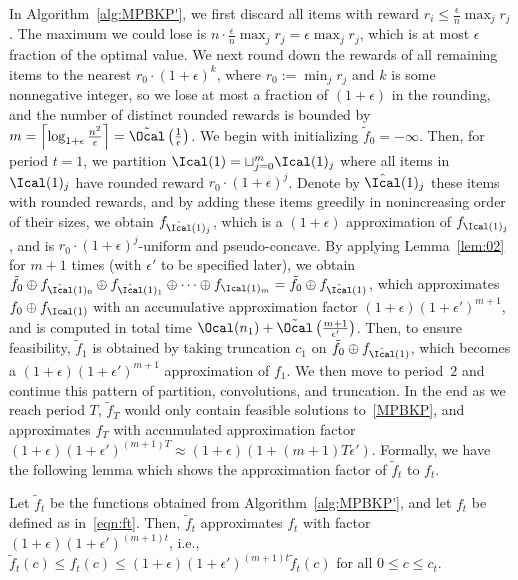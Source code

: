 In Algorithm~\ref{alg:MPBKP'}, we first discard all items with reward $r_i\le \frac{\epsilon}{n}\max_jr_j$. The maximum we could lose is $n\cdot \frac{\epsilon}{n}\max_jr_j = \epsilon\max_jr_j$, which is at most $\epsilon$ fraction of the optimal value. We next round down the rewards of all remaining items  to the nearest $r_0\cdot (1+\epsilon)^k$, where $r_0:=\min_jr_j$ and $k$ is some nonnegative integer, so we lose at most a fraction of $(1+\epsilon)$ in the rounding, and the number of distinct rounded rewards is bounded by $m = \left\lceil\log_{1+\epsilon}\frac{n^2}{\epsilon}\right\rceil = \tilde{\Ocal}\left(\frac{1}{\epsilon}\right)$. We begin with initializing $\tilde{f}_0=-\infty$. Then, for period $t=1$, we partition $\Ical(1)=\sqcup_{j=0}^m \Ical(1)_j$ where all items in $\Ical(1)_j$ have rounded reward $r_0\cdot (1+\epsilon)^j$. Denote by $\hat{\Ical}(1)_j$ these items with rounded rewards, and by adding these items greedily in nonincreasing order of their sizes, we obtain $f_{\hat{\Ical}(1)_j}$, which is a $(1+\epsilon)$ approximation of $f_{\Ical(1)_j}$, and is $r_0\cdot (1+\epsilon)^j$-uniform and pseudo-concave. 
By applying Lemma~\ref{lem:02} for $m+1$ times (with $\epsilon'$ to be specified later), we obtain $\tilde{f}_0\oplus f_{\hat{\Ical}(1)_0}\oplus f_{\hat{\Ical}(1)_1}\oplus\cdots \oplus f_{\Ical(1)_m} = \tilde{f}_0\oplus f_{\hat{\Ical}(1)}$, which approximates $f_0\oplus f_{\Ical(1)}$ with an accumulative approximation factor $(1+\epsilon)(1+\epsilon')^{m+1}$, and is computed in total time $\Ocal(n_1) + \tilde{\Ocal}\left(\frac{m+1}{\epsilon'}\right)$. Then, to ensure feasibility, $\tilde{f}_1$ is obtained by taking truncation $c_1$ on $\tilde{f}_0\oplus f_{\hat{\Ical}(1)}$, which becomes a $(1+\epsilon)(1+\epsilon')^{m+1}$ approximation of $f_1$. We then move to period~$2$ and continue this pattern of partition, convolutions, and truncation. In the end as we reach period $T$, $\tilde{f}_T$ would only contain feasible solutions to~\eqref{MPBKP}, and approximates $f_T$ with accumulated approximation factor $(1+\epsilon)(1+\epsilon')^{(m+1)T}\approx (1+\epsilon)(1+(m+1)T\epsilon')$. Formally, we have the following lemma which shows the approximation factor of $\tilde{f}_t$ to $f_t$.
\begin{lemma}\label{lem:fapprox2}
	Let $\tilde{f}_t$ be the functions obtained from Algorithm~\ref{alg:MPBKP'}, and let $f_t$ be defined as in~\eqref{eqn:ft}. Then, $\tilde{f}_t$ approximates $f_t$ with factor $(1+\epsilon)(1+\epsilon')^{(m+1)t}$, i.e., $\tilde{f}_t(c)\le f_t(c)\le (1+\epsilon)(1+\epsilon')^{(m+1)t}\tilde{f}_t(c)$ for all $0\le c\le c_t$.
\end{lemma}
